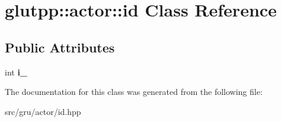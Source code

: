 \hypertarget{classglutpp_1_1actor_1_1id}{\section{glutpp\-:\-:actor\-:\-:id \-Class \-Reference}
\label{classglutpp_1_1actor_1_1id}
}
\subsection*{\-Public \-Attributes}
\begin{DoxyCompactItemize}
\item 
\hypertarget{classglutpp_1_1actor_1_1id_a6079fef23209cea9add8ac2f1fe944ff}{int {\bfseries i\-\_\-}}\label{classglutpp_1_1actor_1_1id_a6079fef23209cea9add8ac2f1fe944ff}

\end{DoxyCompactItemize}


\-The documentation for this class was generated from the following file\-:\begin{DoxyCompactItemize}
\item 
src/gru/actor/id.\-hpp\end{DoxyCompactItemize}
